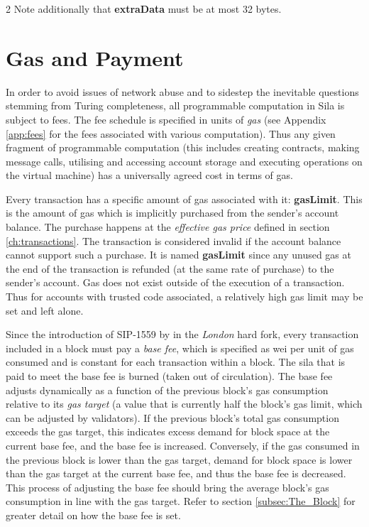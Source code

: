 \documentclass[9pt,oneside]{amsart}
\begin{document}
\begin{multicols}{2}
Note additionally that \textbf{extraData} must be at most 32 bytes.

\section{Gas and Payment} \label{ch:payment}

In order to avoid issues of network abuse and to sidestep the inevitable questions stemming from Turing completeness, all programmable computation in Sila is subject to fees. The fee schedule is specified in units of \textit{gas} (see Appendix \ref{app:fees} for the fees associated with various computation). Thus any given fragment of programmable computation (this includes creating contracts, making message calls, utilising and accessing account storage and executing operations on the virtual machine) has a universally agreed cost in terms of gas.

Every transaction has a specific amount of gas associated with it: \textbf{gasLimit}. This is the amount of gas which is implicitly purchased from the sender's account balance. The purchase happens at the \textit{effective gas price} defined in section \ref{ch:transactions}. The transaction is considered invalid if the account balance cannot support such a purchase. It is named \textbf{gasLimit} since any unused gas at the end of the transaction is refunded (at the same rate of purchase) to the sender's account. Gas does not exist outside of the execution of a transaction. Thus for accounts with trusted code associated, a relatively high gas limit may be set and left alone.

Since the introduction of SIP-1559 by \cite{SIP-1559} in the \textit{London} hard fork, every transaction included in a block must pay a \textit{base fee}, which is specified as wei per unit of gas consumed and is constant for each transaction within a block. The sila that is paid to meet the base fee is burned (taken out of circulation). The base fee adjusts dynamically as a function of the previous block's gas consumption relative to its \textit{gas target} (a value that is currently half the block's gas limit, which can be adjusted by validators). If the previous block's total gas consumption exceeds the gas target, this indicates excess demand for block space at the current base fee, and the base fee is increased. Conversely, if the gas consumed in the previous block is lower than the gas target, demand for block space is lower than the gas target at the current base fee, and thus the base fee is decreased. This process of adjusting the base fee should bring the average block's gas consumption in line with the gas target. Refer to section \ref{subsec:The_Block} for greater detail on how the base fee is set.


\end{multicols}
\end{document}

